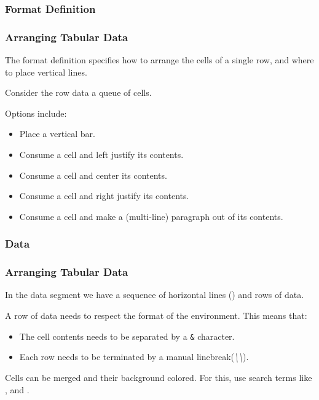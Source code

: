 \subsubsection{Format Definition}
\begin{frame}[fragile]
  \frametitle{Arranging Tabular Data }
  \vspace{3mm}
  The format definition specifies how to arrange the cells of a single row, and where to place vertical lines.
  
  \vspace{5mm}
  Consider the row data a queue of cells.
  
  \pause
  \vspace{5mm}
  Options include:
  \begin{itemize}
    \pause \item \say{\texttt{|}} Place a vertical bar.
    \pause \item {} Consume a cell and left justify its contents.
    \pause \item {} Consume a cell and center its contents.
    \pause \item {} Consume a cell and right justify its contents.
    \pause \item {} Consume a cell and make a (multi-line) paragraph out of its contents.
  \end{itemize}
\end{frame}

\subsubsection{Data}
\begin{frame}[fragile]
  \frametitle{Arranging Tabular Data }
  \vspace{3mm}
  In the data segment we have a sequence of horizontal lines () and rows of data.
  
  \vspace{5mm}
  A row of data needs to respect the format of the  environment. This means that:
  \begin{itemize}
    \item The cell contents needs to be separated by a \texttt{\&} character.
    \item Each row needs to be terminated by a manual linebreak(\textsl{\textbackslash\textbackslash}).
  \end{itemize}
  
  \vspace{5mm}
  Cells can be merged and their background colored. For this, use search terms like ,  and .
\end{frame}

